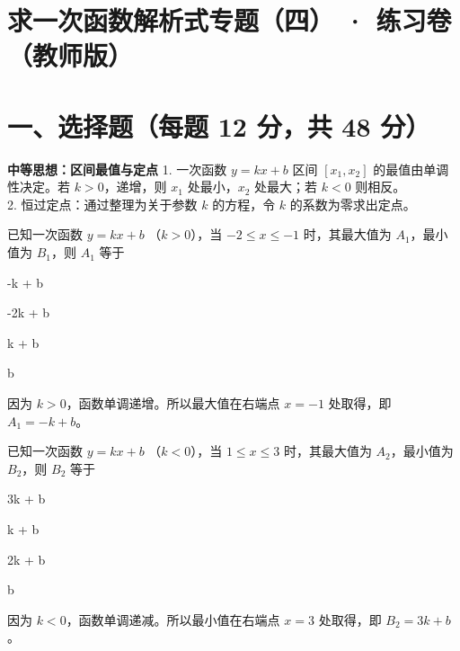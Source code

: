 \documentclass{exam-zh}
\begin{document}
\section*{求一次函数解析式专题（四） · 练习卷（教师版）}

\section*{一、选择题（每题 12 分，共 48 分）}


\begin{keyideabox}
  \textbf{中等思想：区间最值与定点}
  1. 一次函数 $y=kx+b$ 区间 $[x_1, x_2]$ 的最值由单调性决定。若 $k>0$，递增，则 $x_1$ 处最小，$x_2$ 处最大；若 $k<0$ 则相反。\\ 2. 恒过定点：通过整理为关于参数 $k$ 的方程，令 $k$ 的系数为零求出定点。
\end{keyideabox}



\begin{question}[points=12]
  已知一次函数 $y = kx + b$ （$k > 0$），当 $-2 \leq x \leq -1$ 时，其最大值为 $A_1$，最小值为 $B_1$，则 $A_1$ 等于
  \begin{choices}
    \item -k + b
    \item -2k + b
    \item k + b
    \item b
  \end{choices}
  \paren[A]
  \begin{solutionblock}
    因为 $k > 0$，函数单调递增。所以最大值在右端点 $x = -1$ 处取得，即 $A_1 = -k + b$。
  \end{solutionblock}
\end{question}



\begin{question}[points=12]
  已知一次函数 $y = kx + b$ （$k < 0$），当 $1 \leq x \leq 3$ 时，其最大值为 $A_2$，最小值为 $B_2$，则 $B_2$ 等于
  \begin{choices}
    \item 3k + b
    \item k + b
    \item 2k + b
    \item b
  \end{choices}
  \paren[A]
  \begin{solutionblock}
    因为 $k < 0$，函数单调递减。所以最小值在右端点 $x = 3$ 处取得，即 $B_2 = 3k + b$。
  \end{solutionblock}
\end{question}
\end{document}
